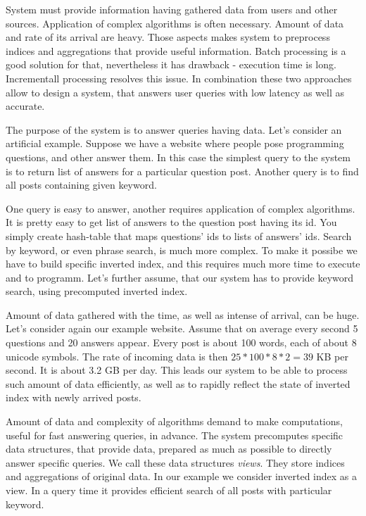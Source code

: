 
System must provide information having gathered data from users and other sources.
Application of complex algorithms is often necessary.
Amount of data and rate of its arrival are heavy.
Those aspects makes system to preprocess indices and aggregations that provide useful information.
Batch processing is a good solution for that, nevertheless it has drawback - execution time is long.
Incrementall processing resolves this issue.
In combination these two approaches allow to design a system, that answers user queries with low latency as well as accurate.

The purpose of the system is to answer queries having data.
Let's consider an artificial example.
Suppose we have a website where people pose programming questions, and other answer them.
In this case the simplest query to the system is to return list of answers for a particular question post.
Another query is to find all posts containing given keyword.

One query is easy to answer, another requires application of complex algorithms.
It is pretty easy to get list of answers to the question post having its id.
You simply create hash-table that maps questions' ids to lists of answers' ids.
Search by keyword, or even phrase search, is much more complex.
To make it possibe we have to build specific inverted index, and this requires much more time to execute and to programm.
Let's further assume, that our system has to provide keyword search, using precomputed inverted index. 

Amount of data gathered with the time, as well as intense of arrival, can be huge.
Let's consider again our example website.
Assume that on average every second 5 questions and 20 answers appear.
Every post is about 100 words, each of about 8 unicode symbols.
The rate of incoming data is then $25*100*8*2=39$ KB per second.
It is about 3.2 GB per day.
This leads our system to be able to process such amount of data efficiently, as well as to rapidly reflect the state of inverted index with newly arrived posts.

Amount of data and complexity of algorithms demand to make computations, useful for fast answering queries, in advance.
The system precomputes specific data structures, that provide data, prepared as much as possible to directly answer specific queries.
We call these data structures \textit{views}.
They store indices and aggregations of original data.
In our example we consider inverted index as a view.
In a query time it provides efficient search of all posts with particular keyword.

